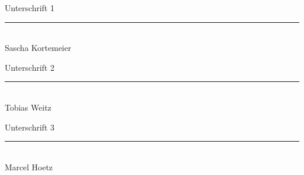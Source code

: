 \documentclass[a4paper, 12pt]{report}
\begin{document}
\begin{flushleft}
Unterschrift 1
\newline \newline
\rule{5cm}{0.4pt}
\\
Sascha Kortemeier
\newline \newline \newline

Unterschrift 2
\newline \newline
\rule{5cm}{0.4pt}
\\
Tobias Weitz
\newline \newline \newline

Unterschrift 3
\newline \newline
\rule{5cm}{0.4pt}
\\
Marcel Hoetz




\end{flushleft}
\end{document}
